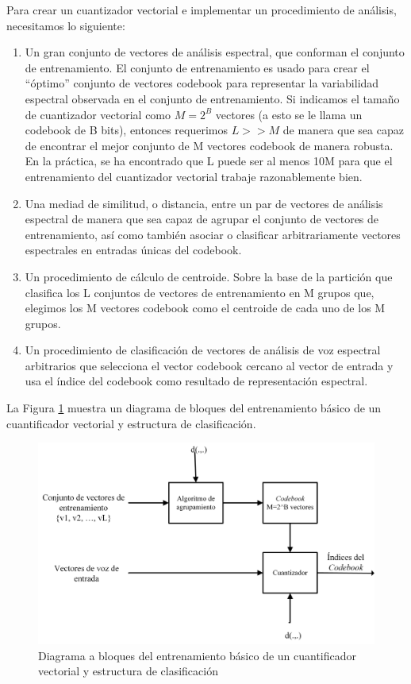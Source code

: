 Para crear un cuantizador vectorial e implementar un procedimiento de análisis, necesitamos lo siguiente:

\begin{enumerate}
\item	Un gran conjunto de vectores de análisis espectral, que conforman el conjunto de entrenamiento. El conjunto de entrenamiento es usado para crear el “óptimo” conjunto de vectores codebook para representar la variabilidad espectral observada en el conjunto de entrenamiento. Si indicamos el tamaño de cuantizador vectorial como $M=2^B$ vectores (a esto se le llama un codebook de B bits), entonces requerimos $L>>M$ de manera que sea capaz de encontrar el mejor conjunto de M vectores codebook de manera robusta. En la práctica, se ha encontrado que L puede ser al menos 10M para que el entrenamiento del cuantizador vectorial trabaje razonablemente bien.
\item	Una mediad de similitud, o distancia, entre un par de vectores de análisis espectral de manera que sea capaz de agrupar el conjunto de vectores de entrenamiento, así como también asociar o clasificar arbitrariamente vectores espectrales en entradas únicas del codebook.
\item	Un procedimiento de cálculo de centroide. Sobre la base de la partición que clasifica los L conjuntos de vectores de entrenamiento en M grupos que, elegimos los M vectores codebook como el centroide de cada uno de los M grupos.
\item	Un procedimiento de clasificación de vectores de análisis de voz espectral arbitrarios que selecciona el vector codebook cercano al vector de entrada y usa el índice del codebook como resultado de representación espectral.
\end{enumerate}

La Figura \ref{fig:vectorQTS} muestra un diagrama de bloques del entrenamiento básico de un cuantificador vectorial y estructura de clasificación.

\begin{figure}[H]
	\centering
	\includegraphics[width=0.6\linewidth]{figures/vectorQTS}
	\caption{Diagrama a bloques del entrenamiento básico de un cuantificador vectorial y estructura de clasificación}
	\label{fig:vectorQTS}
\end{figure}

